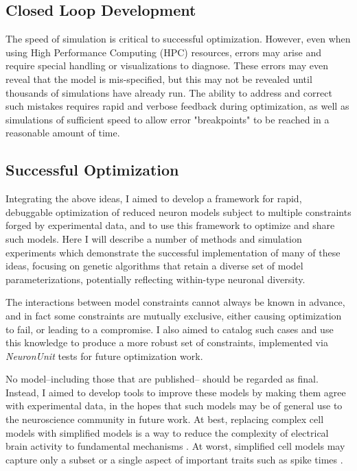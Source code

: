 \subsection{Closed Loop Development}
The speed of simulation is critical to successful optimization. However, even when using High Performance Computing (HPC) resources, errors may arise and require special handling or visualizations to diagnose.  These errors may even reveal that the model is mis-specified, but this may not be revealed until thousands of simulations have already run.
The ability to address and correct such mistakes requires rapid and verbose feedback during optimization, as well as simulations of sufficient speed to allow error "breakpoints" to be reached in a reasonable amount of time.

\subsection{Successful Optimization} 
Integrating the above ideas, I aimed to develop a framework for rapid, debuggable optimization of reduced neuron models subject to multiple constraints forged by experimental data, and to use this framework to optimize and share such models.
Here I will describe a number of methods and simulation experiments which demonstrate the successful implementation of many of these ideas, focusing on genetic algorithms that retain a diverse set of model parameterizations, potentially reflecting  within-type neuronal diversity.

The interactions between model constraints cannot always be known in advance, and in fact some constraints are mutually exclusive, either causing optimization to fail, or leading to a compromise. I also aimed to catalog such cases and use this knowledge to produce a more robust set of constraints, implemented via \emph{NeuronUnit} tests for future optimization work.

No model--including those that are published-- should be regarded as final.
Instead, I aimed to develop tools to improve these models by making them agree with experimental data, in the hopes that such models may be of general use to the neuroscience community in future work.
At best, replacing complex cell models with simplified models is a way to reduce the complexity of electrical brain activity to fundamental mechanisms \citep{teeter2018generalized}. At worst, simplified cell models may capture only a subset or a single aspect of important traits such as spike times \citep{hertag2012approximation}. %

